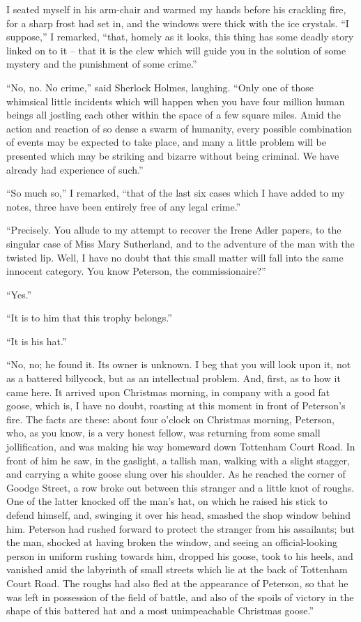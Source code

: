 I seated myself in his arm-chair and warmed my hands
before his crackling fire, for a sharp frost had set in, and the
windows were thick with the ice crystals. “I suppose,” I
remarked, “that, homely as it looks, this thing has some
deadly story linked on to it -- that it is the clew which will
guide you in the solution of some mystery and the punishment
of some crime.”

“No, no. No crime,” said Sherlock Holmes, laughing.
“Only one of those whimsical little incidents which will
happen when you have four million human beings all jostling
each other within the space of a few square miles. Amid the
action and reaction of so dense a swarm of humanity, every
possible combination of events may be expected to take place,
and many a little problem will be presented which may be
striking and bizarre without being criminal. We have already
had experience of such.”

“So much so,” I remarked, “that of the last six cases
which I have added to my notes, three have been entirely
free of any legal crime.”

“Precisely. You allude to my attempt to recover the Irene
Adler papers, to the singular case of Miss Mary Sutherland,
and to the adventure of the man with the twisted lip.
Well, I have no doubt that this small matter will fall into the
same innocent category. You know Peterson, the
commissionaire?”

“Yes.”

“It is to him that this trophy belongs.”

“It is his hat.”

“No, no; he found it. Its owner is unknown. I beg that
you will look upon it, not as a battered billycock, but as an
intellectual problem. And, first, as to how it came here. It
arrived upon Christmas morning, in company with a good fat
goose, which is, I have no doubt, roasting at this moment in
front of Peterson’s fire. The facts are these: about four
o’clock on Christmas morning, Peterson, who, as you know,
is a very honest fellow, was returning from some small
jollification, and was making his way homeward down Tottenham
Court Road. In front of him he saw, in the gaslight, a
tallish man, walking with a slight stagger, and carrying a white
goose slung over his shoulder. As he reached the corner of
Goodge Street, a row broke out between this stranger and a
little knot of roughs. One of the latter knocked off the man’s
hat, on which he raised his stick to defend himself, and, swinging
it over his head, smashed the shop window behind him.
Peterson had rushed forward to protect the stranger from his
assailants; but the man, shocked at having broken the window,
and seeing an official-looking person in uniform rushing towards
him, dropped his goose, took to his heels, and vanished
amid the labyrinth of small streets which lie at the back of
Tottenham Court Road. The roughs had also fled at the
appearance of Peterson, so that he was left in possession of
the field of battle, and also of the spoils of victory in the
shape of this battered hat and a most unimpeachable Christmas
goose.”

